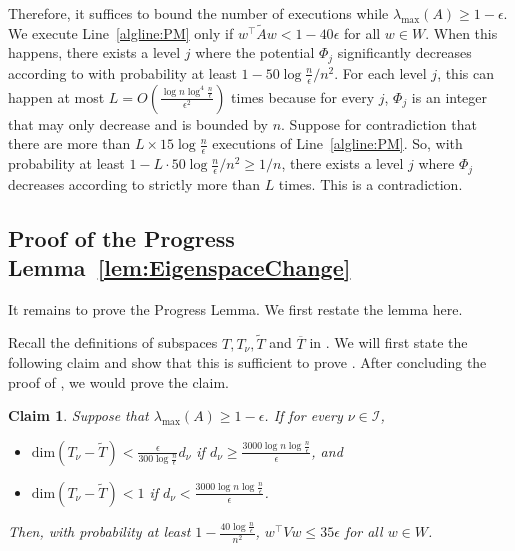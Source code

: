 \documentclass[11pt]{article}
\newtheorem{claim}[theorem]{Claim}
\def\dim#1{\mathrm{dim} (#1)}
\newcommand\ww{\boldsymbol{\mathit{w}}}
\renewcommand\AA{\boldsymbol{\mathit{A}}}
\newcommand\WW{\boldsymbol{\mathit{W}}}
\newcommand\VV{\boldsymbol{\mathit{V}}}
\newcommand\Ttil{{\tilde{\mathit{T}}}}
\newcommand\AAtil{\boldsymbol{\widetilde{\mathit{A}}}}
\begin{document}
Therefore, it suffices to bound the number of executions while $\lambda_{\max}(\AA)\ge1-\epsilon$. We execute Line~\ref{algline:PM} only if $\ww^{\top}\AAtil\ww<1-40\epsilon$ for all $\ww\in\WW$. When this happens, there exists a level $j$ where the potential $\Phi_{j}$ significantly decreases according to  with probability at least $1-50\log\frac{n}{\epsilon}/n^{2}$. For each level $j$, this can happen at most $L=O(\frac{\log n\log^{4}\frac{n}{\epsilon}}{\epsilon^{2}})$ times because for every $j$, $\Phi_{j}$ is an integer that may only decrease and is bounded by $n$. Suppose for contradiction that there are more than $L\times15\log\frac{n}{\epsilon}$ executions of Line~\ref{algline:PM}. So, with probability at least $1-L\cdot50\log\frac{n}{\epsilon}/n^{2}\ge1/n$, there exists a level $j$ where $\Phi_{j}$ decreases according to  strictly more than $L$ times. This is a contradiction. 











\subsection{Proof of the Progress Lemma~\ref{lem:EigenspaceChange}}\label{sec:progress}
It remains to prove the Progress Lemma. We first restate the lemma here.

\progress*
Recall the definitions of subspaces $T,T_\nu,\Ttil$ and $\overline{T}$ in .
We will first state the following claim and show that this is sufficient to prove . After concluding the proof of , we would prove the claim.

\begin{claim}\label{cl:progress} Suppose that $\lambda_{\max}(\AA) \geq 1-\epsilon$. If for every $\nu \in \mathcal{I}$, 
\begin{itemize}
\item $\dim{T_{\nu} -\tilde{T}} < \frac{\epsilon}{300\log\frac{n}{\epsilon}} d_{\nu}$ if $d_{\nu} \geq \frac{3000\log n\log\frac{n}{\epsilon}}{\epsilon}$, and 
\item $\dim{T_{\nu} -\tilde{T}} < 1$ if $d_{\nu} < \frac{3000\log n\log\frac{n}{\epsilon}}{\epsilon}$.
\end{itemize}
Then, with probability at least $1-\frac{40\log\frac{n}{\epsilon}}{n^2}$, $\ww^{\top}\VV\ww\leq 35 \epsilon$ for all $\ww\in \WW$.
\end{claim}
\end{document}
